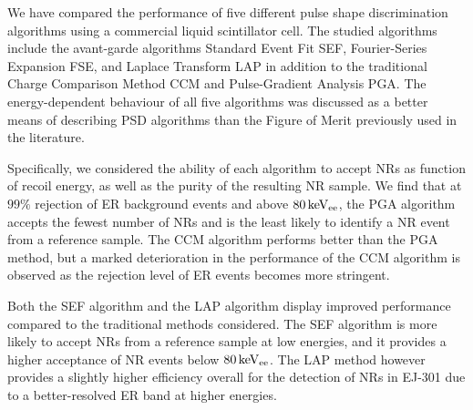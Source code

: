 We have compared the performance of five different pulse shape discrimination algorithms using a commercial liquid scintillator cell. The studied algorithms include the avant-garde algorithms Standard Event Fit SEF, Fourier-Series Expansion FSE, and Laplace Transform LAP in addition to the traditional Charge Comparison Method CCM and Pulse-Gradient Analysis PGA. The energy-dependent behaviour of all five algorithms was discussed as a better means of describing PSD algorithms than the Figure of Merit previously used in the literature.

Specifically, we considered the ability of each algorithm to accept NRs as function of recoil energy, as well as the purity of the resulting NR sample. We find that at $99\%$ rejection of ER background events and above $80\,\mathrm{keV_{ee}}$, the PGA algorithm accepts the fewest number of NRs and is the least likely to identify a NR event from a reference sample. The CCM algorithm performs better than the PGA method, but a marked deterioration in the performance of the CCM algorithm is observed as the rejection level of ER events becomes more stringent.

Both the SEF algorithm and the LAP algorithm display improved performance compared to the traditional methods considered. The SEF algorithm is more likely to accept NRs from a reference sample at low energies, and it provides a higher acceptance of NR events below $80\,\mathrm{keV_{ee}}$. The LAP method however provides a slightly higher efficiency overall for the detection of NRs in EJ-301 due to a better-resolved ER band at higher energies.
